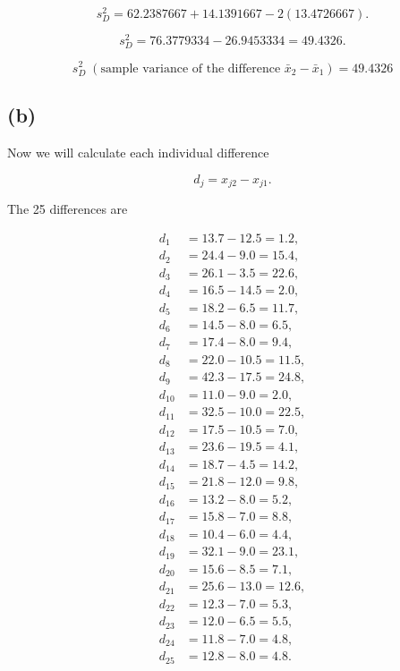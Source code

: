 \documentclass{article}
\begin{document}
$$
s_D^2
=
62.2387667
+
14.1391667
-
2(13.4726667).
$$

$$
s_D^2
=
76.3779334-26.9453334
=
49.4326.
$$

$$
\boxed{
s_D^2\;(\text{sample variance of the difference }\bar{x}_2-\bar{x}_1)
=49.4326
}
$$


\subsection*{(b)}

Now we will calculate each individual difference

$$
d_j=x_{j2}-x_{j1}.
$$

The 25 differences are

\begin{align*}
d_1&=13.7-12.5=1.2,\\
d_2&=24.4-9.0=15.4,\\
d_3&=26.1-3.5=22.6,\\
d_4&=16.5-14.5=2.0,\\
d_5&=18.2-6.5=11.7,\\
d_6&=14.5-8.0=6.5,\\
d_7&=17.4-8.0=9.4,\\
d_8&=22.0-10.5=11.5,\\
d_9&=42.3-17.5=24.8,\\
d_{10}&=11.0-9.0=2.0,\\
d_{11}&=32.5-10.0=22.5,\\
d_{12}&=17.5-10.5=7.0,\\
d_{13}&=23.6-19.5=4.1,\\
d_{14}&=18.7-4.5=14.2,\\
d_{15}&=21.8-12.0=9.8,\\
d_{16}&=13.2-8.0=5.2,\\
d_{17}&=15.8-7.0=8.8,\\
d_{18}&=10.4-6.0=4.4,\\
d_{19}&=32.1-9.0=23.1,\\
d_{20}&=15.6-8.5=7.1,\\
d_{21}&=25.6-13.0=12.6,\\
d_{22}&=12.3-7.0=5.3,\\
d_{23}&=12.0-6.5=5.5,\\
d_{24}&=11.8-7.0=4.8,\\
d_{25}&=12.8-8.0=4.8.
\end{align*}
\end{document}
